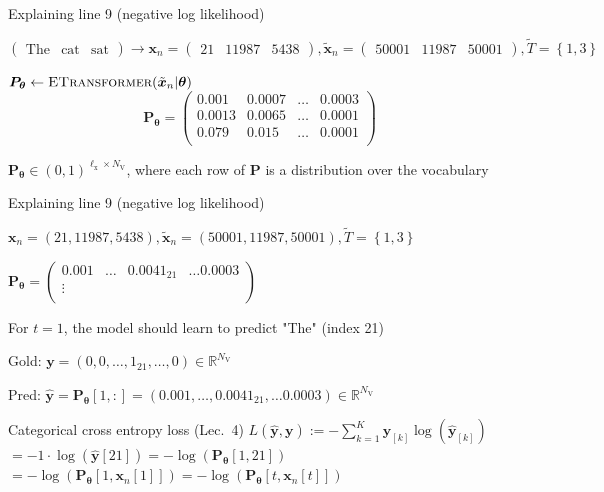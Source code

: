 \documentclass[12pt,aspectratio=169,handout]{beamer}
\begin{document}
\begin{frame}{Explaining line 9 (negative log likelihood)}
	
$
\begin{pmatrix}
	\text{The} &
	\text{cat} &
	\text{sat}
\end{pmatrix}
\rightarrow
\bm{x}_n =
\begin{pmatrix}
	21 &
	11987 &
	5438 
\end{pmatrix},
\bm{\tilde{x}}_n =
\begin{pmatrix}
	50001 &
	11987 &
	50001
\end{pmatrix},
\tilde{T} = \left\{ 1, 3 \right\}
$

$\bm{P_{\theta}} \gets \textsc{ETransformer}(\tilde{\bm{x}}_n | \bm{\theta})$
$$
\bm{P_{\theta}} =
\begin{pmatrix}
0.001 & 0.0007 & \ldots & 0.0003 \\
0.0013 & 0.0065 & \ldots & 0.0001 \\
0.079 & 0.015 & \ldots & 0.0001 \\
\end{pmatrix}
$$

$\bm{P_{\theta}} \in (0,1)^{\ell_{\text{x}} \times N_{\text{V}}}$, where each row of $\bm{P}$ is a distribution over the vocabulary

\end{frame}


\begin{frame}{Explaining line 9 (negative log likelihood)}

\begin{small}
$\bm{x}_n = (21, 11987, 5438), \bm{\tilde{x}}_n = (50001, 11987, 50001), \tilde{T} = \left\{ 1, 3 \right\}$

$
\bm{P_{\theta}} =
\begin{pmatrix}
	0.001 & \ldots & 0.0041_{21} & \ldots 0.0003 \\
	\vdots &  &  &  \\
\end{pmatrix}
$
\end{small}	

For $t = 1$, the model should learn to predict "The" (index 21)

Gold: $\bm{y} = (0, 0, \ldots, 1_{21}, \ldots, 0) \in \mathbb{R}^{N_{\text{V}}}$

Pred: $\bm{\hat{y}} = \bm{P_{\theta}}[1,:] = (0.001, \ldots, 0.0041_{21}, \ldots 0.0003) \in \mathbb{R}^{N_{\text{V}}}$

\begin{block}{Categorical cross entropy loss (Lec.\ 4)}
$L (\bm{\hat{y}, \bm{y}}) := - \sum_{k = 1}^{K} \bm{y}_{[k]} \log \left(  \bm{\hat{y}}_{[k]} \right)$ \\
$= - 1 \cdot \log (\bm{\hat{y}}[21])
= - \log(\bm{P_{\theta}}[1, 21])$ \\
$= - \log(\bm{P_{\theta}}[1, \bm{x}_n[1]]) 
= - \log(\bm{P_{\theta}}[t, \bm{x}_n[t]])$	
\end{block}

\end{frame}
\end{document}
